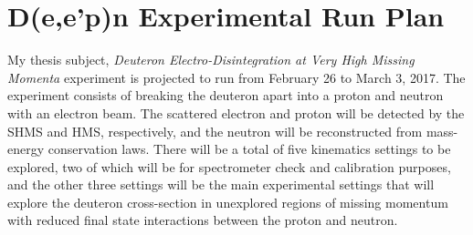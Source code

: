 \documentclass[letterpaper, 12 pt, conference]{ieeeconf}  %
\begin{document}
\section{D(e,e'p)n Experimental Run Plan}
\noindent My thesis subject, \textit{Deuteron Electro-Disintegration at Very High Missing Momenta} experiment is projected to run from February 26 to
March 3, 2017. The experiment consists of breaking the deuteron apart into a proton and neutron with an electron beam. The scattered electron and proton
will be detected by the SHMS and HMS, respectively, and the neutron will be reconstructed from mass-energy conservation laws. There will be a total of
five kinematics settings to be explored, two of which will be for spectrometer check and calibration purposes, and the other three settings will be the main
experimental settings that will explore the deuteron cross-section in unexplored regions of missing momentum with reduced final state interactions between
the proton and neutron. \\
\end{document}
